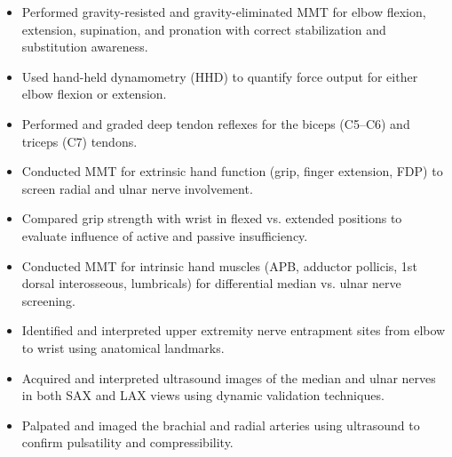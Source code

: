 \begin{itemize}
  \item [$\square$] Performed gravity-resisted and gravity-eliminated MMT for elbow flexion, extension, supination, and pronation with correct stabilization and substitution awareness.
  \item [$\square$] Used hand-held dynamometry (HHD) to quantify force output for either elbow flexion or extension.
  \item [$\square$] Performed and graded deep tendon reflexes for the biceps (C5–C6) and triceps (C7) tendons.
  \item [$\square$] Conducted MMT for extrinsic hand function (grip, finger extension, FDP) to screen radial and ulnar nerve involvement.
  \item [$\square$] Compared grip strength with wrist in flexed vs. extended positions to evaluate influence of active and passive insufficiency.
  \item [$\square$] Conducted MMT for intrinsic hand muscles (APB, adductor pollicis, 1st dorsal interosseous, lumbricals) for differential median vs. ulnar nerve screening.
  \item [$\square$] Identified and interpreted upper extremity nerve entrapment sites from elbow to wrist using anatomical landmarks.
  \item [$\square$] Acquired and interpreted ultrasound images of the median and ulnar nerves in both SAX and LAX views using dynamic validation techniques.
  \item [$\square$] Palpated and imaged the brachial and radial arteries using ultrasound to confirm pulsatility and compressibility.
\end{itemize}

